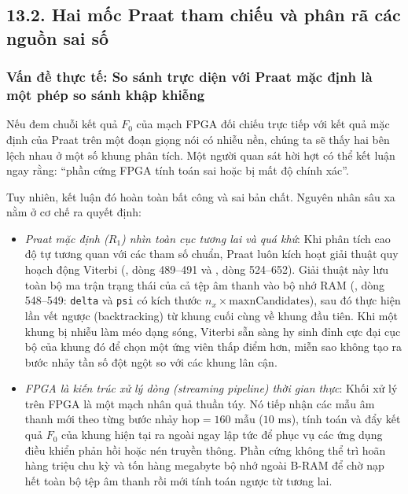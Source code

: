 \subsection*{13.2. Hai mốc Praat tham chiếu và phân rã các nguồn sai số}

\subsubsection*{Vấn đề thực tế: So sánh trực diện với Praat mặc định là một phép so sánh khập khiễng}
Nếu đem chuỗi kết quả $F_0$ của mạch FPGA đối chiếu trực tiếp với kết quả mặc định của Praat trên một đoạn giọng nói có nhiễu nền, chúng ta sẽ thấy hai bên lệch nhau ở một số khung phân tích. Một người quan sát hời hợt có thể kết luận ngay rằng: ``phần cứng FPGA tính toán sai hoặc bị mất độ chính xác''.

Tuy nhiên, kết luận đó hoàn toàn bất công và sai bản chất. Nguyên nhân sâu xa nằm ở cơ chế ra quyết định:
\begin{itemize}
    \item \emph{Praat mặc định ($R_1$) nhìn toàn cục tương lai và quá khứ}: Khi phân tích cao độ tự tương quan với các tham số chuẩn, Praat luôn kích hoạt giải thuật quy hoạch động Viterbi (, dòng 489--491 và , dòng 524--652). Giải thuật này lưu toàn bộ ma trận trạng thái của cả tệp âm thanh vào bộ nhớ RAM (, dòng 548--549: \texttt{delta} và \texttt{psi} có kích thước $n_x \times \text{maxnCandidates}$), sau đó thực hiện lần vết ngược (backtracking) từ khung cuối cùng về khung đầu tiên. Khi một khung bị nhiễu làm méo dạng sóng, Viterbi sẵn sàng hy sinh đỉnh cực đại cục bộ của khung đó để chọn một ứng viên thấp điểm hơn, miễn sao không tạo ra bước nhảy tần số đột ngột so với các khung lân cận.
    \item \emph{FPGA là kiến trúc xử lý dòng (streaming pipeline) thời gian thực}: Khối xử lý trên FPGA là một mạch nhân quả thuần túy. Nó tiếp nhận các mẫu âm thanh mới theo từng bước nhảy $\text{hop} = 160\text{ mẫu}$ ($10\text{ ms}$), tính toán và đẩy kết quả $F_0$ của khung hiện tại ra ngoài ngay lập tức để phục vụ các ứng dụng điều khiển phản hồi hoặc nén truyền thông. Phần cứng không thể trì hoãn hàng triệu chu kỳ và tốn hàng megabyte bộ nhớ ngoài B-RAM để chờ nạp hết toàn bộ tệp âm thanh rồi mới tính toán ngược từ tương lai.
\end{itemize}

